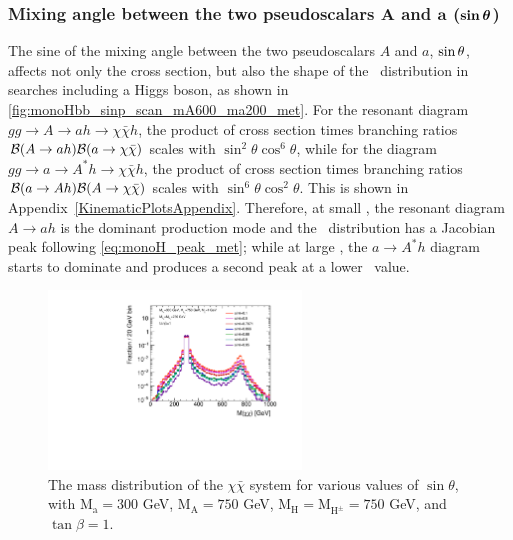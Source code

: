 \subsubsection[Mixing angle between the two pseudoscalars $A$ and $a$ ($\sinp$)]{Mixing angle between the two pseudoscalars $\boldsymbol{A}$ and $\boldsymbol{a}$ ($\boldsymbol{\sin\theta}$)}

The sine of the mixing angle between the two pseudoscalars $A$ and $a$, $\sinp$, affects not only the cross section, but also the shape of the \MET\ distribution in searches including a Higgs boson, as shown in \autoref{fig:monoHbb_sinp_scan_mA600_ma200_met}. 
For the resonant diagram $gg\rightarrow A \rightarrow ah \rightarrow \chi\bar{\chi}h$, the product of cross section times branching ratios ${\cal B}(A\rightarrow ah){\cal B}(a \rightarrow \chi\bar{\chi})$ scales with $\sin^2\theta\cos^6\theta$, while for the diagram $gg\rightarrow a \rightarrow A^*h \rightarrow \chi\bar{\chi}h$, the product of cross section times branching ratios ${\cal B}(a\rightarrow Ah){\cal B}(A \rightarrow \chi\bar{\chi})$ scales with $\sin^6\theta\cos^2\theta$. 
This is shown in Appendix~\autoref{KinematicPlotsAppendix}.
Therefore, at small \sinp, the resonant diagram $A\rightarrow ah$ is the dominant production mode and the \MET\ distribution has a Jacobian peak following \autoref{eq:monoH_peak_met}; while at large \sinp, the $a\rightarrow A^*h$ diagram starts to dominate and produces a second peak at a lower \MET\ value. 

\begin{figure}
  \centering
  \includegraphics[width=0.6\textwidth]{texinputs/04_grid/figures/DMHF/benchmarking/MDM_1_Ma_300_MA_750_tanb_1.0_SCAN_sinp_v2/mchichi.pdf}
  \caption{The mass distribution of the $\chi \bar{\chi}$ system for various values of $\sin\theta$, with $\mathrm{M_a}=300$ GeV, $\mathrm{M_A}=750$ GeV, $\mathrm{M_H}=\mathrm{M_{H^{\pm}}}=750$ GeV, and $\tan\beta=1$.}
  \label{fig:mchichi_sinp}
\end{figure} 

